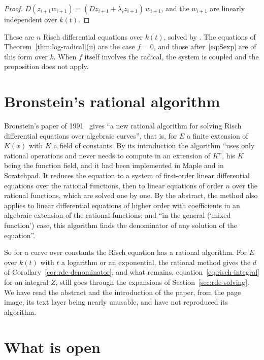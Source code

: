 \begin{proof}
$D(z_{i+1} w_{i+1}) = (Dz_{i+1} + \lambda_i z_{i+1})\, w_{i+1}$, and the
$w_{i+1}$ are linearly independent over $k(t)$.
\end{proof}

These are $n$ Risch differential equations over $k(t)$, solved by
. The equations of Theorem~\ref{thm:log-radical}(ii) are the
case $f = 0$, and those after~\eqref{eq:Sexp} are of this form over $k$. When
$f$ itself involves the radical, the system is coupled and the proposition
does not apply.

\section{Bronstein's rational algorithm}\label{sec:rde-rational}

Bronstein's paper of 1991~\cite{bronstein1991} gives ``a new rational
algorithm for solving Risch differential equations over algebraic curves'',
that is, for $E$ a finite extension of $K(x)$ with $K$ a field of constants.
By its introduction the algorithm ``uses only rational operations and never
needs to compute in an extension of $K$'', his $K$ being the function
field, and it had been implemented in
Maple and in Scratchpad. It reduces the equation to a system of first-order
linear differential equations over the rational functions, then to linear
equations of order $n$ over the rational functions, which are solved one by
one. By the abstract, the method also
applies to linear differential equations of higher order with coefficients in
an algebraic extension of the rational functions; and ``in the general
(`mixed function') case, this algorithm finds the denominator of any
solution of the equation''.

So for a curve over constants the Risch equation has a rational algorithm.
For $E$ over $k(t)$ with $t$ a logarithm or an exponential, the rational
method gives the $d$ of Corollary~\ref{cor:rde-denominator}, and what
remains, equation~\eqref{eq:risch-integral} for an integral $Z$, still goes
through the expansions of Section~\ref{sec:rde-solving}. We have read the
abstract and the introduction of the paper, from the page image, its text
layer being nearly unusable, and have not reproduced its algorithm.

\section{What is open}\label{sec:rde-open}

